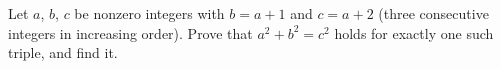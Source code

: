 Let $a$, $b$, $c$ be nonzero integers with $b=a+1$ and $c=a+2$ (three consecutive integers in increasing order). Prove that $a^2+b^2=c^2$ holds for exactly one such triple, and find it.
